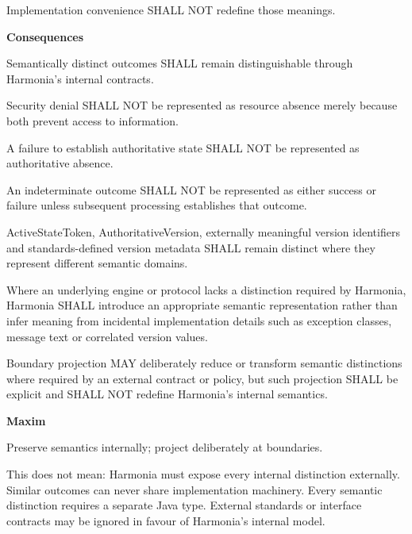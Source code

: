 Implementation convenience SHALL NOT redefine those meanings.



\par\medskip\textbf{Consequences}\par


Semantically distinct outcomes SHALL remain distinguishable through Harmonia's internal contracts.



Security denial SHALL NOT be represented as resource absence merely because both prevent access to information.



A failure to establish authoritative state SHALL NOT be represented as authoritative absence.



An indeterminate outcome SHALL NOT be represented as either success or failure unless subsequent processing establishes that outcome.



ActiveStateToken, AuthoritativeVersion, externally meaningful version identifiers and standards-defined version metadata SHALL remain distinct where they represent different semantic domains.



Where an underlying engine or protocol lacks a distinction required by Harmonia, Harmonia SHALL introduce an appropriate semantic representation rather than infer meaning from incidental implementation details such as exception classes, message text or correlated version values.



Boundary projection MAY deliberately reduce or transform semantic distinctions where required by an external contract or policy, but such projection SHALL be explicit and SHALL NOT redefine Harmonia's internal semantics.



\par\medskip\textbf{Maxim}\par


Preserve semantics internally; project deliberately at boundaries.



This does not mean: Harmonia must expose every internal distinction externally. Similar outcomes can never share implementation machinery. Every semantic distinction requires a separate Java type. External standards or interface contracts may be ignored in favour of Harmonia's internal model.


